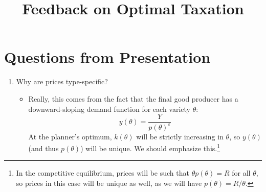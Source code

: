 \documentclass[11pt]{article}
\title{Feedback on Optimal Taxation}
\author{}
\date{}
\begin{document}
\maketitle

\section{Questions from Presentation}

\begin{enumerate}
    \item Why are prices type-specific? 
    \begin{itemize}
        \item Really, this comes from the fact that the final good producer has a downward-sloping demand function for each variety \( \theta \): 
        \[y\left( \theta \right) = \frac{Y}{p\left( \theta \right)^\varepsilon}\]
        At the planner's optimum, \( k(\theta) \) will be strictly increasing in \( \theta \), so \( y(\theta) \) (and thus \( p(\theta) \)) will be unique. We should emphasize this.\footnote{In the competitive equilibrium, prices will be such that \( \theta p\left( \theta \right) = R \) for all \( \theta \), so prices in this case will be unique as well, as we will have \( p\left( \theta \right) = R/\theta \).}
    \end{itemize}
\end{enumerate}
\end{document}
